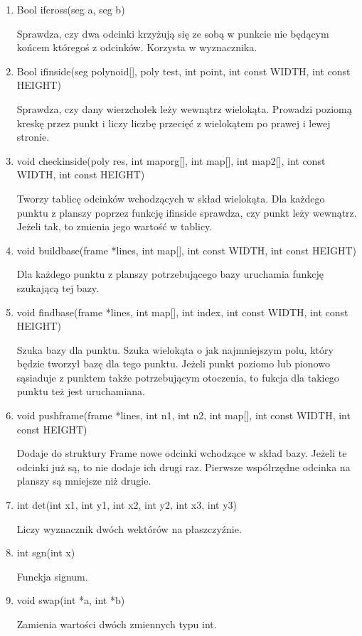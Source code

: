 \documentclass{article}
\begin{document}
\begin{enumerate}
\item \textunderscore Bool ifcross(seg a, seg b)

Sprawdza, czy dwa odcinki krzyżują się ze sobą w punkcie nie będącym końcem któregoś z odcinków. Korzysta w wyznacznika.

\item \textunderscore Bool ifinside(seg polynoid[], poly test, int point, int const WIDTH, int const HEIGHT)

Sprawdza, czy dany wierzchołek leży wewnątrz wielokąta. Prowadzi poziomą kreskę przez punkt i liczy liczbę przecięć z wielokątem po prawej i lewej stronie.

\item void checkinside(poly res, int maporg[], int map[], int map2[], int const WIDTH, int const HEIGHT)

Tworzy tablicę odcinków wchodzących w skład wielokąta. Dla każdego punktu z planszy poprzez funkcję ifinside sprawdza, czy punkt leży wewnątrz. Jeżeli tak, to zmienia jego wartość w tablicy.

\item void buildbase(frame *lines, int map[], int const WIDTH, int const HEIGHT)

Dla każdego punktu z planszy potrzebującego bazy uruchamia funkcję szukającą tej bazy.

\item void findbase(frame *lines, int map[], int index, int const WIDTH, int const HEIGHT)

Szuka bazy dla punktu. Szuka wielokąta o jak najmniejszym polu, który będzie tworzył bazę dla tego punktu. Jeżeli punkt poziomo lub pionowo sąsiaduje z punktem także potrzebującym otoczenia, to fukcja dla takiego punktu też jest uruchamiana. 

\item void push\textunderscore frame(frame *lines, int n1, int n2, int map[], int const WIDTH, int const HEIGHT)

Dodaje do struktury Frame nowe odcinki wchodzące w skład bazy. Jeżeli te odcinki już są, to nie dodaje ich drugi raz. Pierwsze współrzędne odcinka na planszy są mniejsze niż drugie.

\item int det(int x1, int y1, int x2, int y2, int x3, int y3)

Liczy wyznacznik dwóch wektórów na płaszczyźnie.

\item int sgn(int x)

Funckja signum.

\item void swap(int *a, int *b)

Zamienia wartości dwóch zmiennych typu int.

\end{enumerate}
\end{document}
